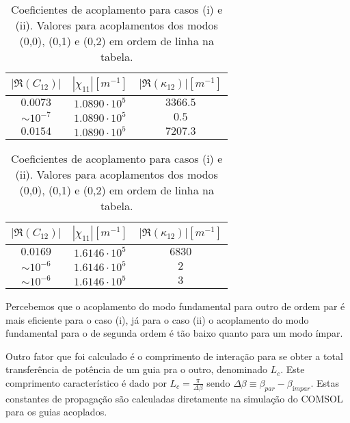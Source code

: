 \documentclass[final,12pt,times,twocolumn]{elsarticle}
\begin{document}
\begin{table}[h]
    \centering
    \begin{subtable}{0.45\textwidth}
        \centering
        \begin{tabular}{ccc}
            \toprule
            $|\Re(C_{12})|$ & $|\chi_{11}| [m^{-1}]$ & $|\Re(\kappa_{12})| [m^{-1}]$ \\ 
            \midrule
            $0.0073$ & $1.0890 \cdot 10^5$ & $3366.5$ \\
            $\sim 10^{-7}$ & $1.0890 \cdot 10^5$ & $0.5$ \\
            $0.0154$ & $1.0890 \cdot 10^5$ & $7207.3$ \\
            \bottomrule
        \end{tabular}
        \caption{Caso (i).}
    \end{subtable}
    \hfill
    \begin{subtable}{0.45\textwidth}
        \centering
        \begin{tabular}{ccc}
            \toprule
            $|\Re(C_{12})|$ & $|\chi_{11}| [m^{-1}]$ & $|\Re(\kappa_{12})| [m^{-1}]$ \\ 
            \midrule
            $0.0169$ & $1.6146 \cdot 10^5 $ & $6830$ \\
            $\sim 10^{-6}$ & $1.6146 \cdot 10^5 $ & $2$ \\
            $\sim 10^{-6}$ & $1.6146 \cdot 10^5 $ & $3$ \\
            \bottomrule
        \end{tabular}
        \caption{Caso (ii).}
    \end{subtable}
    \caption{Coeficientes de acoplamento para casos (i) e (ii). Valores para acoplamentos dos modos (0,0), (0,1) e (0,2) em ordem de linha na tabela.}
    \label{tab:splitter_coefficients}
\end{table}

Percebemos que o acoplamento do modo fundamental para outro de ordem par é mais eficiente para o caso (i), já para o caso (ii) o acoplamento do modo fundamental para o de segunda ordem é tão baixo quanto para um modo ímpar.

Outro fator que foi calculado é o comprimento de interação para se obter a total transferência de potência de um guia pra o outro, denominado $L_c$. Este comprimento característico é dado por $L_c = \frac{\pi}{\Delta \beta}$ sendo $\Delta \beta \equiv \beta_{par} - \beta_{ímpar}$. Estas constantes de propagação são calculadas diretamente na simulação do COMSOL para os guias acoplados. 
\end{document}
